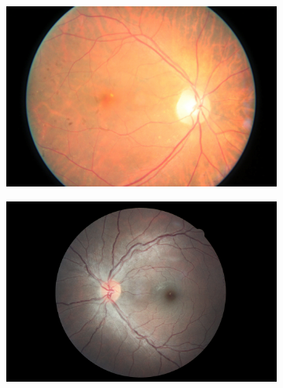 \begin{figure}[htbp]
     \begin{subfigure}[b]{0.19\textwidth}
         \centering
         \includegraphics[width=\textwidth, height=\textwidth]{figures/chapter4/Dataset/noDR/41_left.jpeg}
    \end{subfigure}
    \hfill
    \begin{subfigure}[b]{0.19\textwidth}
         \centering
         \includegraphics[width=\textwidth, height=\textwidth]{figures/chapter4/Dataset/mild/114_left.jpeg}

\end{subfigure}
\end{figure}
